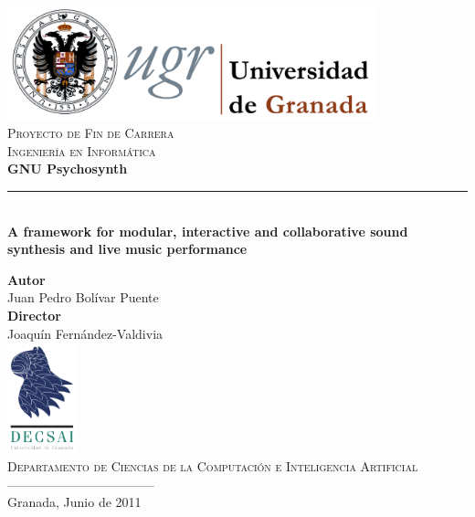 
\begin{titlepage}
  \newlength{\centeroffset}
  \setlength{\centeroffset}{-0.5\oddsidemargin}
  \addtolength{\centeroffset}{0.5\evensidemargin}
  \thispagestyle{empty}


  \begin{minipage}{\textwidth}  
    \centering
    \includegraphics[width=0.8\textwidth]{pic/logo-ugr.png}\\[1cm]

    \textsc{\Large Proyecto de Fin de Carrera\\%
    }
    \textsc{Ingeniería en Informática}\\[0.5cm]
    
    {\Huge\bfseries\sffamily GNU Psychosynth}
    \noindent\rule[-1ex]{\textwidth}{3pt}\\[2.5ex]
    {\large\bfseries 
      A framework for modular, interactive and collaborative sound
      synthesis and live music performance}
  \end{minipage}

  \vspace{1cm}

  \begin{minipage}{\textwidth}
    \centering
    \textbf{Autor}\\ {Juan Pedro Bolívar Puente}\\%
    \textbf{Director}\\
    {Joaquín Fernández-Valdivia}\\[0.5cm]
    \includegraphics[width=0.15\textwidth]{pic/logo-decsai.png}\\%
    \textsc{Departamento de Ciencias de la Computación e Inteligencia Artificial}\\
    \textsc{-----------------------------------}\\
    Granada, Junio de 2011
  \end{minipage}


\end{titlepage}

